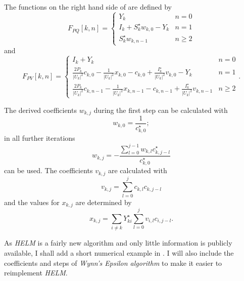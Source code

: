The functions on the right hand side of  are defined by
\begin{equation}
	F_{PQ}[k,n] = 
	\begin{cases}
		Y_k & n = 0 \\
		I_k + S_k^\star w_{k,0} - Y_k & n = 1 \\
		S_k^\star w_{k,n - 1} & n \ge 2
	\end{cases}
\end{equation}
and
\begin{equation}
	F_{PV}[k,n] = 
	\begin{cases}
		I_k + Y_k & n = 0 \\
		\frac{2 P_k}{|U_k|^2} c_{k,0} - \frac{1}{|U_k|^2} x_{k,0} - c_{k,0} + \frac{I_k^\star}{|U_k|^2} v_{k,0} - Y_k & n = 1 \\
		\frac{2 P_k}{|U_k|^2} c_{k,n-1} - \frac{1}{|U_k|^2} x_{k,n-1} - c_{k,n-1} + \frac{I_k^\star}{|U_k|^2} v_{k,n-1} & n \ge 2
	\end{cases}.
\end{equation}

The derived coefficients $w_{k,j}$ during the first step can be calculated with
\begin{equation}
	w_{k,0} = \frac{1}{c_{k,0}^\star};
\end{equation}
in all further iterations
\begin{equation}
	w_{k,j} = - \frac{\sum_{l = 0}^{j - 1} w_{k,l} c_{k,j - l}^\star}{c_{k,0}^\star}
\end{equation}
can be used. The coefficients $v_{k,j}$ are calculated with
\begin{equation}
	v_{k,j} = \sum_{l = 0}^j c_{k,l} c_{k,j - l}
\end{equation}
and the values for $x_{k,j}$ are determined by
\begin{equation}
	x_{k,j} = \sum_{i \ne k} Y_{ki}^\star \sum_{l = 0}^j v_{i,l} c_{i,j - l}.
\end{equation}

As \emph{HELM} is a fairly new algorithm and only little information is publicly available, I shall add a short numerical example in . I will also include the coefficients and steps of \emph{Wynn's Epsilon algorithm} to make it easier to reimplement \emph{HELM}.